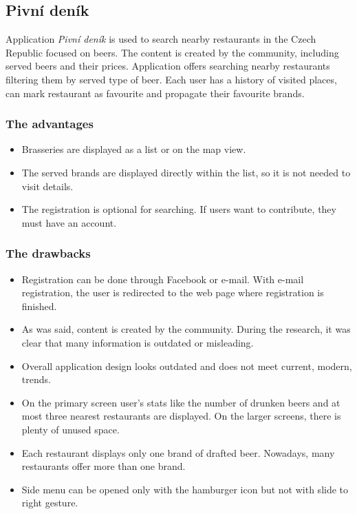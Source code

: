 \subsection{Pivní deník}
 Application \textit{Pivní deník} is used to search nearby restaurants in the Czech Republic focused on beers. The content is created by the community, including served beers and their prices.  Application offers searching nearby restaurants filtering them by served type of beer. Each user has a history of visited places, can mark restaurant as favourite and propagate their favourite brands.

\subsubsection{The advantages}
\begin{itemize}
    \item Brasseries are displayed as a list or on the map view.
    \item The served brands are displayed directly within the list, so it is not needed to visit details.
    \item The registration is optional for searching. If users want to contribute, they must have an account.
\end{itemize}

\subsubsection{The drawbacks}
\begin{itemize}
    \item Registration can be done through Facebook or e-mail. With e-mail registration, the user is redirected to the web page where registration is finished.
    \item As was said, content is created by the community. During the research, it was clear that many information is outdated or misleading. 
    \item Overall application design looks outdated and does not meet current, modern,  trends.
    \item On the primary screen user's stats like the number of drunken beers and at most three nearest restaurants are displayed. On the larger screens, there is plenty of unused space. 
    \item Each restaurant displays only one brand of drafted beer. Nowadays, many restaurants offer more than one brand. 
    \item Side menu can be opened only with the hamburger icon but not with slide to right gesture.
\end{itemize}

